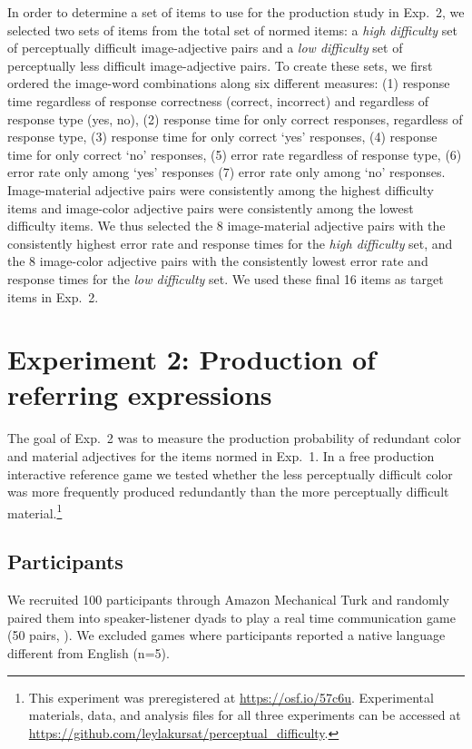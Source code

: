 \documentclass[12pt,letterpaper]{article}
\begin{document}
In order to determine a set of items to use for the production study in Exp.~2, we selected two sets of items from the total set of normed items: a \textit{high difficulty} set of perceptually difficult image-adjective pairs and a  \textit{low difficulty} set of perceptually less difficult image-adjective pairs. To create these sets, we first ordered the image-word combinations along six different measures: (1) response time regardless of response correctness (correct, incorrect) and regardless of  response type (yes, no), (2) response time for only correct responses, regardless of response type, (3) response time for only correct `yes' responses, (4) response time for only correct `no' responses, (5) error rate regardless of response type, (6) error rate  only among `yes' responses (7) error rate  only among `no' responses. Image-material adjective pairs were consistently among the highest difficulty items and image-color adjective pairs were consistently among the lowest difficulty items. We thus selected the 8  image-material adjective pairs with the consistently highest error rate and response times for the \textit{high difficulty} set, and the 8 image-color adjective pairs with the consistently lowest error rate and response times for the \textit{low difficulty} set. We used these final 16 items as target items in Exp.~2. 

\section{Experiment 2: Production of referring expressions} 

The goal of Exp.~2 was to measure the production probability of redundant color and material adjectives for the items normed in Exp.~1. In a free production interactive reference game we tested whether the less perceptually difficult color was more frequently produced redundantly than the more perceptually difficult material.\footnote{This  experiment was preregistered at \href{https://osf.io/57c6u}{https://osf.io/57c6u}. Experimental materials, data, and analysis files for all three experiments can be accessed at \href{https://github.com/leylakursat/perceptual_difficulty}{https://github.com/leylakursat/perceptual\_difficulty}.}

\subsection{Participants} 

We recruited 100 participants through Amazon Mechanical Turk and randomly paired them into speaker-listener dyads to play a real time communication game (50 pairs, \citealt{Hawkins2015}). We excluded games where participants reported a native language different from English (n=5).
\end{document}

